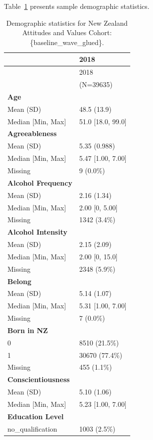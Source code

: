 \documentclass[
  single column]{article}
\begin{document}
Table~\ref{tbl-appendix-baseline} presents sample demographic
statistics.

\begin{longtable}[]{@{}ll@{}}
\caption{Demographic statistics for New Zealand Attitudes and Values
Cohort:
\{baseline\_wave\_glued\}.}\label{tbl-appendix-baseline}\tabularnewline
\toprule\noalign{}
& 2018 \\
\midrule\noalign{}
\endfirsthead
\toprule\noalign{}
& 2018 \\
\midrule\noalign{}
\endhead
\bottomrule\noalign{}
\endlastfoot
& (N=39635) \\
\textbf{Age} & \\
Mean (SD) & 48.5 (13.9) \\
Median {[}Min, Max{]} & 51.0 {[}18.0, 99.0{]} \\
\textbf{Agreeableness} & \\
Mean (SD) & 5.35 (0.988) \\
Median {[}Min, Max{]} & 5.47 {[}1.00, 7.00{]} \\
Missing & 9 (0.0\%) \\
\textbf{Alcohol Frequency} & \\
Mean (SD) & 2.16 (1.34) \\
Median {[}Min, Max{]} & 2.00 {[}0, 5.00{]} \\
Missing & 1342 (3.4\%) \\
\textbf{Alcohol Intensity} & \\
Mean (SD) & 2.15 (2.09) \\
Median {[}Min, Max{]} & 2.00 {[}0, 15.0{]} \\
Missing & 2348 (5.9\%) \\
\textbf{Belong} & \\
Mean (SD) & 5.14 (1.07) \\
Median {[}Min, Max{]} & 5.31 {[}1.00, 7.00{]} \\
Missing & 7 (0.0\%) \\
\textbf{Born in NZ} & \\
0 & 8510 (21.5\%) \\
1 & 30670 (77.4\%) \\
Missing & 455 (1.1\%) \\
\textbf{Conscientiousness} & \\
Mean (SD) & 5.10 (1.06) \\
Median {[}Min, Max{]} & 5.23 {[}1.00, 7.00{]} \\
\textbf{Education Level} & \\
no\_qualification & 1003 (2.5\%) \\

\end{longtable}
\end{document}
